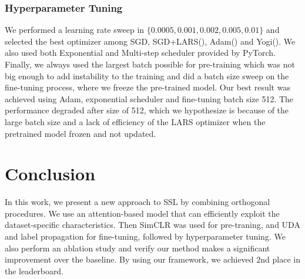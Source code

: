 \documentclass[10pt,twocolumn,letterpaper]{article}
\begin{document}
\subsubsection{Hyperparameter Tuning}
We performed a learning rate sweep in $\{0.0005, 0.001, 0.002, 0.005, 0.01\}$ and selected the best optimizer among SGD, SGD+LARS(\cite{LARS, torchLARS}), Adam(\cite{Adam}) and Yogi(\cite{Yogi}). We also used both Exponential and Multi-step scheduler provided by PyTorch. Finally, we always used the largest batch possible for pre-training which was not big enough to add instability to the training and did a batch size sweep on the fine-tuning process, where we freeze the pre-trained model. Our best result was achieved using Adam, exponential scheduler and fine-tuning batch size 512. The performance degraded after size of 512, which we hypothesize is because of the large batch size and a lack of efficiency of the LARS optimizer when the pretrained model frozen and not updated.


\section{Conclusion}
In this work, we present a new approach to SSL by combining orthogonal procedures.
We use an attention-based model that can efficiently exploit the dataset-specific characteristics. Then SimCLR was used for pre-traning, and UDA and label propagation for fine-tuning, followed by hyperparameter tuning. We also perform an ablation study and verify our method makes a significant improvement over the baseline. By using our framework, we achieved $2$nd place in the leaderboard.

{\small


}
\end{document}
